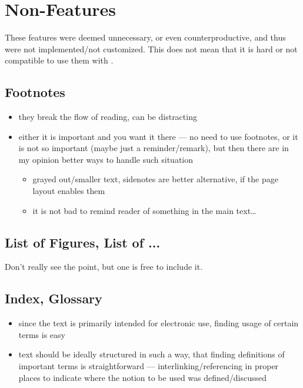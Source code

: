 \section{Non-Features}%
\label{sec:Non-Features}

These features were deemed unnecessary, or even counterproductive, and thus were not implemented/not customized.
This does not mean that it is hard or not compatible to use them with \TeXtured{}.

\subsection{Footnotes}%
\label{sub:Footnotes}

\begin{itemize}
    \item they break the flow of reading, can be distracting
    \item either it is important and you want it there --- no need to use footnotes,
          or it is not so important (maybe just a reminder/remark), but then there
          are in my opinion better ways to handle such situation
          \begin{itemize}
              \item grayed out/smaller text, sidenotes are better alternative, if the page layout enables them
              \item it is not bad to remind reader of something in the main text\ldots
          \end{itemize}
\end{itemize}

\subsection{List of Figures, List of ...}%
\label{sub:List of Figures List of ...}

Don't really see the point, but one is free to include it.

\subsection{Index, Glossary}%
\label{sub:Index Glossary}

\begin{itemize}
    \item since the text is primarily intended for electronic use, finding usage of certain terms is easy
    \item text should be ideally structured in such a way, that finding definitions of important terms is straightforward --- interlinking/referencing in proper places to indicate where the notion to be used was defined/discussed
\end{itemize}

